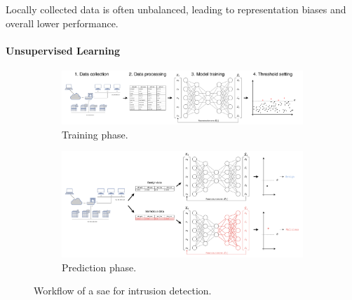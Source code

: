 \begin{challenge}
  Locally collected data is often unbalanced, leading to representation biases and overall lower performance.
  \label{chall:bias}
\end{challenge}


\paragraph{Unsupervised Learning}

\begin{figure}
  \captionsetup{justification=justified,singlelinecheck=false}
  \centering
  \begin{subfigure}{\textwidth}
    \includegraphics[width=\textwidth]{figures/ae-train.drawio.pdf}
    \caption{
      Training phase.
      \label{fig:bg.ae.train}
    }
  \end{subfigure}
  \begin{subfigure}{\textwidth}
    \includegraphics[width=.75\textwidth,left]{figures/ae-predict.drawio.pdf}
    \caption{
      Prediction phase.
      \label{fig:bg.ae.predict}
    }
  \end{subfigure}
  \caption{
    Workflow of a \acrfull{sae} for intrusion detection.
    \label{fig:bg.ae}
  }
\end{figure}

